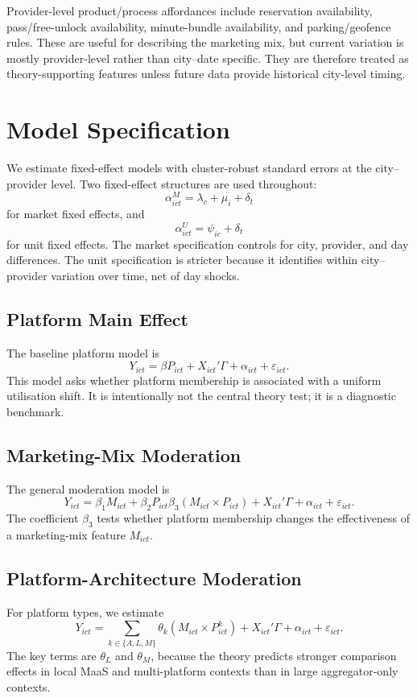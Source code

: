 \documentclass[11pt]{article}
\begin{document}
Provider-level product/process affordances include reservation availability, pass/free-unlock
availability, minute-bundle availability, and parking/geofence rules. These are useful for
describing the marketing mix, but current variation is mostly provider-level rather than
city--date specific. They are therefore treated as theory-supporting features unless future
data provide historical city-level timing.

\section{Model Specification}

We estimate fixed-effect models with cluster-robust standard errors at the city--provider
level. Two fixed-effect structures are used throughout:
\[
\alpha^{M}_{ict}=\lambda_c+\mu_i+\delta_t
\]
for market fixed effects, and
\[
\alpha^{U}_{ict}=\psi_{ic}+\delta_t
\]
for unit fixed effects. The market specification controls for city, provider, and day
differences. The unit specification is stricter because it identifies within city--provider
variation over time, net of day shocks.

\subsection{Platform Main Effect}

The baseline platform model is
\[
Y_{ict}=\beta P_{ict}+X_{ict}'\Gamma+\alpha_{ict}+\varepsilon_{ict}.
\]
This model asks whether platform membership is associated with a uniform utilisation shift.
It is intentionally not the central theory test; it is a diagnostic benchmark.

\subsection{Marketing-Mix Moderation}

The general moderation model is
\[
Y_{ict}=\beta_1 M_{ict}+\beta_2 P_{ict}
\beta_3(M_{ict}\times P_{ict})+X_{ict}'\Gamma+\alpha_{ict}+\varepsilon_{ict}.
\]
The coefficient $\beta_3$ tests whether platform membership changes the effectiveness of a
marketing-mix feature $M_{ict}$.

\subsection{Platform-Architecture Moderation}

For platform types, we estimate
\[
Y_{ict}=\sum_{k\in\{A,L,M\}}\theta_k(M_{ict}\times P^{k}_{ict})
 +X_{ict}'\Gamma+\alpha_{ict}+\varepsilon_{ict}.
\]
The key terms are $\theta_L$ and $\theta_M$, because the theory predicts stronger comparison
effects in local MaaS and multi-platform contexts than in large aggregator-only contexts.
\end{document}
